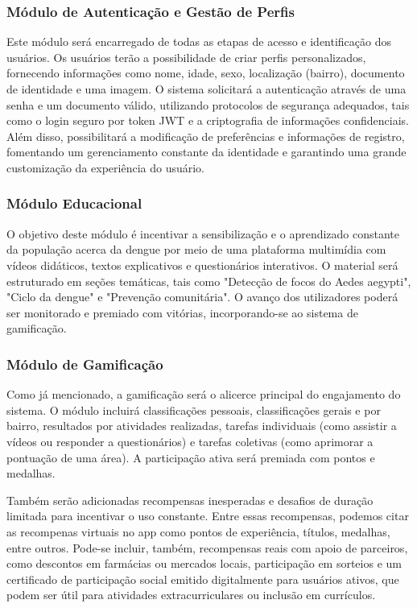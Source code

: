 \documentclass[a4paper, 12pt]{article}
\begin{document}
\subsubsection{Módulo de Autenticação e Gestão de Perfis}

Este módulo será encarregado de todas as etapas de acesso e identificação dos usuários.  Os usuários terão a possibilidade de criar perfis personalizados, fornecendo informações como nome, idade, sexo, localização (bairro), documento de identidade e uma imagem.  O sistema solicitará a autenticação através de uma senha e um documento válido, utilizando protocolos de segurança adequados, tais como o login seguro por token JWT e a criptografia de informações confidenciais.  Além disso, possibilitará a modificação de preferências e informações de registro, fomentando um gerenciamento constante da identidade e garantindo uma grande customização da experiência do usuário.

\subsubsection{Módulo Educacional}

O objetivo deste módulo é incentivar a sensibilização e o aprendizado constante da população acerca da dengue por meio de uma plataforma multimídia com vídeos didáticos, textos explicativos e questionários interativos.  O material será estruturado em seções temáticas, tais como "Detecção de focos do Aedes aegypti", "Ciclo da dengue" e "Prevenção comunitária".  O avanço dos utilizadores poderá ser monitorado e premiado com vitórias, incorporando-se ao sistema de gamificação.

\subsubsection{Módulo de Gamificação}

Como já mencionado, a gamificação será o alicerce principal do engajamento do sistema.  O módulo incluirá classificações pessoais, classificações gerais e por bairro, resultados por atividades realizadas, tarefas individuais (como assistir a vídeos ou responder a questionários) e tarefas coletivas (como aprimorar a pontuação de uma área).  A participação ativa será premiada com pontos e medalhas.  
\par Também serão adicionadas recompensas inesperadas e desafios de duração limitada para incentivar o uso constante. Entre essas recompensas, podemos citar as recompenas virtuais no app como pontos de experiência, títulos, medalhas, entre outros. Pode-se incluir, também, recompensas reais com apoio de parceiros, como descontos em farmácias ou mercados locais, participação em sorteios e um certificado de participação social emitido digitalmente para usuários ativos, que podem ser útil para atividades extracurriculares ou inclusão em currículos.
\end{document}
